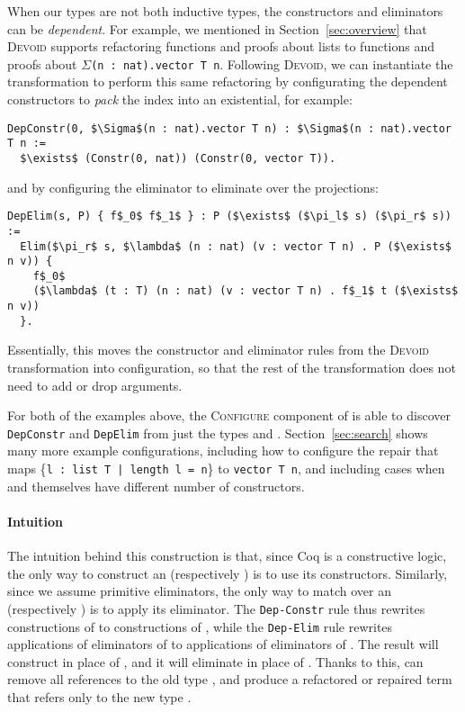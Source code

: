When our types are not both inductive types, the constructors and eliminators can be \textit{dependent}.
For example, we mentioned in Section~\ref{sec:overview} that \textsc{Devoid} supports
refactoring functions and proofs about lists to functions and proofs about $\Sigma$\lstinline{(n : nat).vector T n}.
Following \textsc{Devoid}, we can instantiate the \toolname transformation to perform this same refactoring
by configurating the dependent constructors to \textit{pack} the index into an existential, for example:

\begin{lstlisting}
DepConstr(0, $\Sigma$(n : nat).vector T n) : $\Sigma$(n : nat).vector T n :=
  $\exists$ (Constr(0, nat)) (Constr(0, vector T)).
\end{lstlisting}
and by configuring the eliminator to eliminate over the projections:

\begin{lstlisting}
DepElim(s, P) { f$_0$ f$_1$ } : P ($\exists$ ($\pi_l$ s) ($\pi_r$ s)) :=
  Elim($\pi_r$ s, $\lambda$ (n : nat) (v : vector T n) . P ($\exists$ n v)) {
    f$_0$
    ($\lambda$ (t : T) (n : nat) (v : vector T n) . f$_1$ t ($\exists$ n v))
  }. 
\end{lstlisting}
Essentially, this moves the constructor and eliminator rules from the \textsc{Devoid} transformation
into configuration, so that the rest of the \toolname transformation does not need to add or drop arguments.

For both of the examples above, the \textsc{Configure} component of \toolname is able to discover \lstinline{DepConstr}
and \lstinline{DepElim} from just the types \A and \B.
Section~\ref{sec:search} shows many more example configurations, including
how to configure the repair that maps \{\lstinline{l : list T | length l = n}\} to \lstinline{vector T n},
and including cases when \A and \B themselves have different number of constructors.

\paragraph{Intuition}
The intuition behind this construction is that,
since Coq is a constructive logic, the only way to construct an \A (respectively \B) is to use its constructors.
Similarly, since we assume primitive eliminators, the only way to match over an \A (respectively \B) is to apply its eliminator. 
The \lstinline{Dep-Constr} rule thus rewrites constructions of \A to constructions of \B,
while the \lstinline{Dep-Elim} rule rewrites applications of eliminators of \A to applications of eliminators of \B.
The result will construct \B in place of \A, and it will eliminate \B in place of \A.
Thanks to this, \toolname can remove all references to the old type \A,
and produce a refactored or repaired term that refers only to the new type \B.

